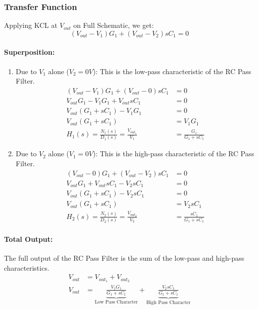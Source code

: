 \subsubsection{Transfer Function}
Applying KCL at $V_{out}$ on Full Schematic, we get:
\[
  (V_{out} - V_{1}){G_1} + (V_{out} - V_{2}){sC_1} = 0
\]
\paragraph{Superposition:}
\begin{enumerate}
  \item Due to \(V_{1}\) alone (\(V_{2} = 0V\)):
    This is the low-pass characteristic of the RC Pass Filter.
    \begin{align*}
      (V_{out} - V_{1}){G_1} + (V_{out} - 0){sC_1} &= 0 \\
      V_{out}G_1 - V_{1}G_1 + V_{out}sC_1 &= 0 \\
      V_{out}(G_1 + sC_1) - V_{1}G_1 &= 0 \\
      V_{out}(G_1 + sC_1) &= V_{1}G_1 \\
      H_1(s) = \frac{N_1(s)}{D_1(s)} = \frac{V_{out_1}}{V_{1}} &= \frac{G_1}{G_1 + sC_1}
    \end{align*}
  \item Due to \(V_{2}\) alone (\(V_{1} = 0V\)):
    This is the high-pass characteristic of the RC Pass Filter.
    \begin{align*}
      (V_{out} - 0){G_1} + (V_{out} - V_{2}){sC_1} &= 0 \\
      V_{out}G_1 + V_{out}sC_1 - V_{2}sC_1 &= 0 \\
      V_{out}(G_1 + sC_1) - V_{2}sC_1 &= 0 \\
      V_{out}(G_1 + sC_1) &= V_{2}sC_1 \\
      H_2(s) = \frac{N_2(s)}{D_2(s)} = \frac{V_{out_2}}{V_{2}} &= \frac{sC_1}{G_1 + sC_1}
    \end{align*}
\end{enumerate}

\paragraph{Total Output:}
The full output of the RC Pass Filter is the sum of the
low-pass and high-pass characteristics.
\begin{align*}
  V_{out} &= V_{out_1} + V_{out_2} \\
  V_{out} &= \underbrace{\frac{V_{1}G_1}{G_1 + sC_1}}_{\text{Low Pass Character}} + \underbrace{\frac{V_{2}sC_1}{G_1 + sC_1}}_{\text{High Pass Character}}
\end{align*}

